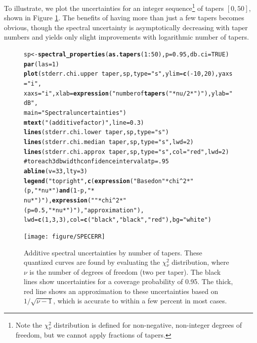 \documentclass{article}\usepackage{graphicx, color}
\makeatletter
\newcommand{\hlfunctioncall}[1]{\textcolor[rgb]{0.501960784313725,0,0.329411764705882}{\textbf{#1}}}%
\newcommand{\hlstring}[1]{\textcolor[rgb]{0.6,0.6,1}{#1}}%
\newcommand{\hlcomment}[1]{\textcolor[rgb]{0.180392156862745,0.6,0.341176470588235}{#1}}%
\newenvironment{kframe}{%
 \def\at@end@of@kframe{}%
 \ifinner\ifhmode%
  \def\at@end@of@kframe{\end{minipage}}%
  \begin{minipage}{\columnwidth}%
 \fi\fi%
 \def\FrameCommand##1{\hskip\@totalleftmargin \hskip-\fboxsep
 \colorbox{shadecolor}{##1}\hskip-\fboxsep
     \hskip-\linewidth \hskip-\@totalleftmargin \hskip\columnwidth}%
 \MakeFramed {\advance\hsize-\width
   \@totalleftmargin\z@ \linewidth\hsize
   \@setminipage}}%
 {\par\unskip\endMakeFramed%
 \at@end@of@kframe}
\newenvironment{knitrout}{}{} %
\makeatother
\begin{document}
To illustrate, we 
plot the uncertainties for an integer sequence\footnote{
Note the $\chi{}_{\nu}^2$ distribution is defined for non-negative,
non-integer degrees of freedom, but we cannot apply
fractions of tapers.} of tapers $[0, 50]$, shown in
Figure \ref{fig:psderr}.  The benefits of having more than just
a few tapers becomes obvious, though the spectral uncertainty
is asymptotically decreasing with taper numbers and yields
only slight improvements with logarithmic number of tapers.

\begin{figure}[htb!]
\begin{center}
\begin{knitrout}
\color{fgcolor}\begin{kframe}
\begin{alltt}
sp <- \hlfunctioncall{spectral_properties}(\hlfunctioncall{as.tapers}(1:50), p = 0.95, db.ci = TRUE)
\hlfunctioncall{par}(las = 1)
\hlfunctioncall{plot}(stderr.chi.upper ~ taper, sp, type = \hlstring{"s"}, ylim = \hlfunctioncall{c}(-10, 20), yaxs = \hlstring{"i"}, 
    xaxs = \hlstring{"i"}, xlab = \hlfunctioncall{expression}(\hlstring{"number of \hlfunctioncall{tapers} ("} * nu/2 * \hlstring{")"}), ylab = \hlstring{"dB"}, 
    main = \hlstring{"Spectral uncertainties"})
\hlfunctioncall{mtext}(\hlstring{"(additive factor)"}, line = 0.3)
\hlfunctioncall{lines}(stderr.chi.lower ~ taper, sp, type = \hlstring{"s"})
\hlfunctioncall{lines}(stderr.chi.median ~ taper, sp, type = \hlstring{"s"}, lwd = 2)
\hlfunctioncall{lines}(stderr.chi.approx ~ taper, sp, type = \hlstring{"s"}, col = \hlstring{"red"}, lwd = 2)
\hlcomment{# to reach 3 db width confidence interval at p=.95}
\hlfunctioncall{abline}(v = 33, lty = 3)
\hlfunctioncall{legend}(\hlstring{"topright"}, \hlfunctioncall{c}(\hlfunctioncall{expression}(\hlstring{"Based on "} * chi^2 * \hlstring{"(p,"} * nu * \hlstring{") \hlfunctioncall{and} (1-p,"} * 
    nu * \hlstring{")"}), \hlfunctioncall{expression}(\hlstring{""} * chi^2 * \hlstring{"(p=0.5,"} * nu * \hlstring{")"}), \hlstring{"approximation"}), 
    lwd = \hlfunctioncall{c}(1, 3, 3), col = \hlfunctioncall{c}(\hlstring{"black"}, \hlstring{"black"}, \hlstring{"red"}), bg = \hlstring{"white"})
\end{alltt}
\end{kframe}
\texttt{[image: figure/SPECERR]} 

\end{knitrout}

\caption{Additive spectral uncertainties by number of tapers.
These quantized curves are found
by evaluating the $\chi{}_{\nu}^2$ distribution, where $\nu$ is
the number of degrees of freedom (two per taper).  
The black lines show uncertainties for a coverage probability of 0.95.
The thick, red line shows an approximation to these uncertainties
based on $1/\sqrt{\nu-1}$, which is accurate to within a few percent in most cases.
}
\label{fig:psderr}
\end{center}
\end{figure}
\end{document}
